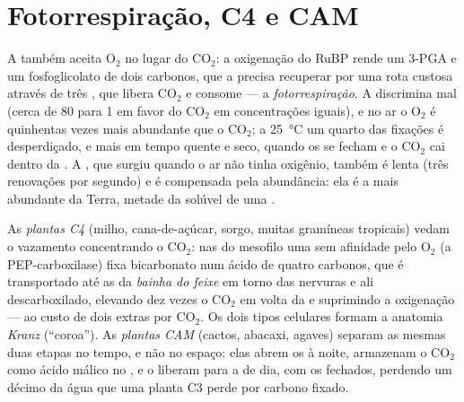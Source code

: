 \section{Fotorrespiração, C4 e CAM}

\begin{proposition}\label{prop:b1:photosynthesis:photorespiration}
A  também aceita $\mathrm{O_2}$ no lugar do $\mathrm{CO_2}$: a
oxigenação do RuBP rende um 3-PGA e um fosfoglicolato de dois carbonos,
que a  precisa recuperar por uma rota custosa através de três
, que libera $\mathrm{CO_2}$ e consome  --- a
\emph{fotorrespiração}. A  discrimina mal (cerca de \qty{80}{}
para 1 em favor do $\mathrm{CO_2}$ em concentrações iguais), e no ar o
$\mathrm{O_2}$ é quinhentas vezes mais abundante que o $\mathrm{CO_2}$;
a \qty{25}{\celsius} um quarto das fixações é desperdiçado, e mais em
tempo quente e seco, quando os  se fecham e o $\mathrm{CO_2}$
cai dentro da . A , que surgiu quando o ar não tinha
oxigênio, também é lenta (três renovações por segundo) e é compensada
pela abundância: ela é a  mais abundante da Terra, metade da
 solúvel de uma .
\end{proposition}

\begin{definition}\label{def:b1:photosynthesis:c4cam}
As \emph{plantas C4} (milho, cana-de-açúcar, sorgo, muitas gramíneas
tropicais) vedam o vazamento concentrando o $\mathrm{CO_2}$: nas 
do mesofilo uma  sem afinidade pelo $\mathrm{O_2}$ (a
PEP-carboxilase) fixa bicarbonato num ácido de quatro carbonos, que é
transportado até as  da \emph{bainha do feixe} em torno das
nervuras e ali descarboxilado, elevando dez vezes o $\mathrm{CO_2}$ em
volta da  e suprimindo a oxigenação --- ao custo de dois 
extras por $\mathrm{CO_2}$. Os dois tipos celulares formam a anatomia
\emph{Kranz} (``coroa''). As \emph{plantas CAM} (cactos, abacaxi,
agaves) separam as mesmas duas etapas no tempo, e não no espaço: elas
abrem os  à noite, armazenam o $\mathrm{CO_2}$ como ácido
málico no , e o liberam para a  de dia, com os 
fechados, perdendo um décimo da água que uma planta C3 perde por carbono
fixado.
\end{definition}

